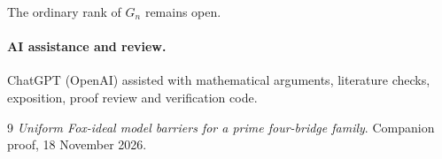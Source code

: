 \documentclass[11pt]{article}
\begin{document}
The ordinary rank of $G_n$ remains open.

\paragraph{AI assistance and review.}
ChatGPT (OpenAI) assisted with mathematical arguments, literature checks,
exposition, proof review and verification code.

\begin{thebibliography}{9}
 \emph{Uniform Fox-ideal model barriers for a prime
four-bridge family}. Companion proof, 18 November 2026.
\end{thebibliography}
\end{document}
